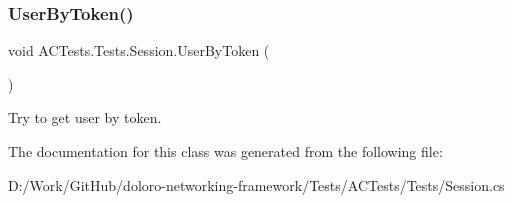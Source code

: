 \subsubsection{\texorpdfstring{User\+By\+Token()}{UserByToken()}}
{\footnotesize\ttfamily void A\+C\+Tests.\+Tests.\+Session.\+User\+By\+Token (\begin{DoxyParamCaption}{ }\end{DoxyParamCaption})}



Try to get user by token. 



The documentation for this class was generated from the following file\+:\begin{DoxyCompactItemize}
\item 
D\+:/\+Work/\+Git\+Hub/doloro-\/networking-\/framework/\+Tests/\+A\+C\+Tests/\+Tests/Session.\+cs\end{DoxyCompactItemize}

